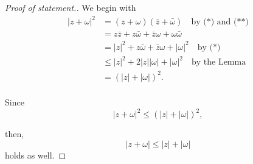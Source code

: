 \documentclass[../hw4]{subfiles}
\begin{document}
\begin{enumerate}[label= (\alph*)]
    \begin{proof}[Proof of statement.]
        We begin with
        \begin{align*}
            {|z+\omega|}^2&=(z+\omega)(\bar{z}+\bar{\omega}) \quad\text{by (*) and (**)} \\
            &= z\bar{z}+z\bar{\omega}+\bar{z}\omega+\omega\bar{\omega}\\
            &= {|z|}^2+z\bar{\omega}+\bar{z}\omega+{|\omega|}^2 \quad\text{by (*)}\\
            &\leq{|z|}^2+2|z||\omega|+{|\omega|}^2 \quad\text{by the Lemma} \\
            &={(|z|+|\omega|)}^2. \\
        \end{align*}

        Since \[{|z+\omega|}^2\leq{(|z|+|\omega|)}^2,\]

        then, \[|z+\omega|\leq|z|+|\omega|\] holds as well.
    \end{proof}

    \begin{figure*}[ht]
    \centering
    \caption{Proof of triangle inequality in the complex plane.}
    \end{figure*}

      
      
      

\end{enumerate}
\end{document}

